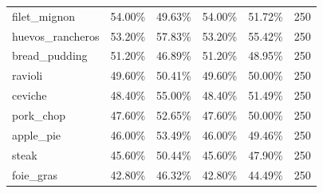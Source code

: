 \begin{table}[t]
\begin{tabular}{lccccr}
filet\_mignon & 54.00\% & 49.63\% & 54.00\% & 51.72\% & 250 \\
huevos\_rancheros & 53.20\% & 57.83\% & 53.20\% & 55.42\% & 250 \\
bread\_pudding & 51.20\% & 46.89\% & 51.20\% & 48.95\% & 250 \\
ravioli & 49.60\% & 50.41\% & 49.60\% & 50.00\% & 250 \\
ceviche & 48.40\% & 55.00\% & 48.40\% & 51.49\% & 250 \\
pork\_chop & 47.60\% & 52.65\% & 47.60\% & 50.00\% & 250 \\
apple\_pie & 46.00\% & 53.49\% & 46.00\% & 49.46\% & 250 \\
steak & 45.60\% & 50.44\% & 45.60\% & 47.90\% & 250 \\
foie\_gras & 42.80\% & 46.32\% & 42.80\% & 44.49\% & 250 \\
\bottomrule
\end{tabular}
\end{table}
